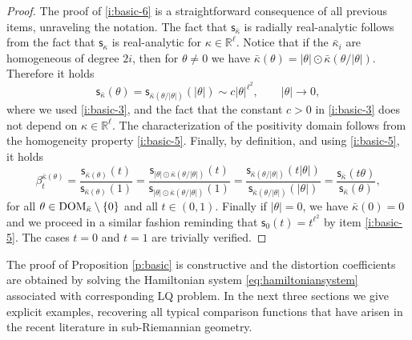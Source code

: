 \documentclass[11pt,a4paper]{article}
\theoremstyle{plain}
\theoremstyle{definition}
\theoremstyle{remark}
\numberwithin{equation}{section}
\newcommand{\R}{\mathbb{R}} %
\newcommand{\DOM}{{\rm{DOM}}}
\newcommand{\sfs}{\mathsf{s}}
\begin{document}
\begin{proof}
The proof of \ref{i:basic-6} is a straightforward consequence of all previous items, unraveling the notation. The fact that $\sfs_{\bar{\kappa}}$ is radially real-analytic follows from the fact that $\sfs_{\kappa}$ is real-analytic for $\kappa\in \R^\ell$. Notice that if the $\bar{\kappa}_i$ are homogeneous of degree $2i$, then for $\theta \neq 0$ we have $\bar{\kappa}(\theta) = |\theta|\odot \bar{\kappa}(\theta/|\theta|)$. Therefore it holds
\begin{equation}
\sfs_{\bar{\kappa}}(\theta) = \sfs_{\bar{\kappa}(\theta/|\theta|)}(|\theta|) \sim c |\theta|^{\ell^2}, \qquad |\theta| \to 0,
\end{equation}
where we used \ref{i:basic-3}, and the fact that the constant $c>0$ in \ref{i:basic-3} does not depend on $\kappa \in \R^\ell$. The characterization of the positivity domain follows from the homogeneity property \ref{i:basic-5}. Finally, by definition, and using \ref{i:basic-5}, it holds
\begin{equation}
\beta_t^{\bar{\kappa}(\theta)} = \frac{\sfs_{\bar{\kappa}(\theta)}(t)}{\sfs_{\bar{\kappa}(\theta)}(1)} =
\frac{\sfs_{|\theta|\odot\bar{\kappa}(\theta/|\theta|)}(t)}{\sfs_{|\theta|\odot\bar{\kappa}(\theta/|\theta|)}(1)}=
\frac{\sfs_{\bar{\kappa}(\theta/|\theta|)}(t|\theta|)}{\sfs_{\bar{\kappa}(\theta/|\theta|)}( |\theta|)}=
 \frac{\sfs_{\bar{\kappa}}(t\theta)}{\sfs_{\bar{\kappa}}(\theta)},
\end{equation}
for all $\theta \in \DOM_{\bar{\kappa}}\setminus\{0\}$ and all $t\in (0,1)$. Finally if $|\theta|=0$, we have $\bar\kappa(0)=0$ and we proceed in a similar fashion reminding that $\sfs_0(t) = t^{\ell^2}$ by item \ref{i:basic-5}. The cases $t=0$ and $t=1$ are trivially verified.
\end{proof}

The proof of Proposition \ref{p:basic} is constructive and the distortion coefficients are obtained by solving the Hamiltonian system \eqref{eq:hamiltoniansystem} associated with corresponding LQ problem. In the next three sections we give explicit examples, recovering all typical comparison functions that have arisen in the recent literature in sub-Riemannian geometry.
\end{document}
